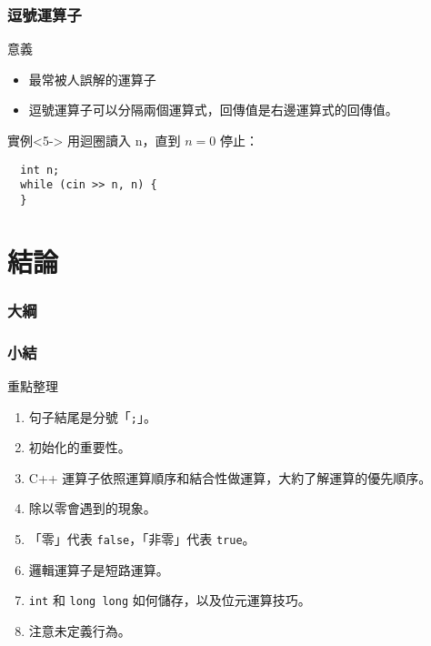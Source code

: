 \documentclass[utf8]{beamer}
\begin{document}
\begin{CJK}{UTF8}{bkai}
\begin{frame}[fragile]
  \frametitle{逗號運算子}
  \begin{block}{意義}
    \begin{itemize}
    \item 最常被人誤解的\alert{運算子}
    \item<4-> 逗號運算子可以\alert{分隔}兩個運算式，回傳值是\alert{右邊}運算式的回傳值。
    \end{itemize}
  \end{block}
  \begin{exampleblock}{實例}<5->
  用迴圈讀入 n，直到 $n=0$ 停止：
    \pause \pause \pause \pause \pause
    \begin{lstlisting}
  int n;
  while (cin >> n, n) {
  }
    \end{lstlisting}
  \end{exampleblock}
\end{frame}

\section{結論}
\begin{frame}
  \frametitle{大綱}
  \begin{multicols}{2}
    \tableofcontents[currentsection]
  \end{multicols}
\end{frame}

\begin{frame}[fragile]
  \frametitle{小結}
  \begin{alertblock}{重點整理}
    \begin{enumerate}[<+->]
    \item 句子結尾是分號「\lstinline{;}{}」。
    \item 初始化的重要性。
    \item C++ 運算子依照運算順序和結合性做運算，大約了解運算的優先順序。
    \item 除以零會遇到的現象。
    \item 「零」代表 \lstinline{false}{}，「非零」代表 \lstinline{true}{}。
    \item 邏輯運算子是短路運算。
    \item \lstinline{int}{} 和 \lstinline{long long}{} 如何儲存，以及位元運算技巧。
    \item 注意未定義行為。
    \end{enumerate}
  \end{alertblock}
\end{frame}


\end{CJK}
\end{document}
